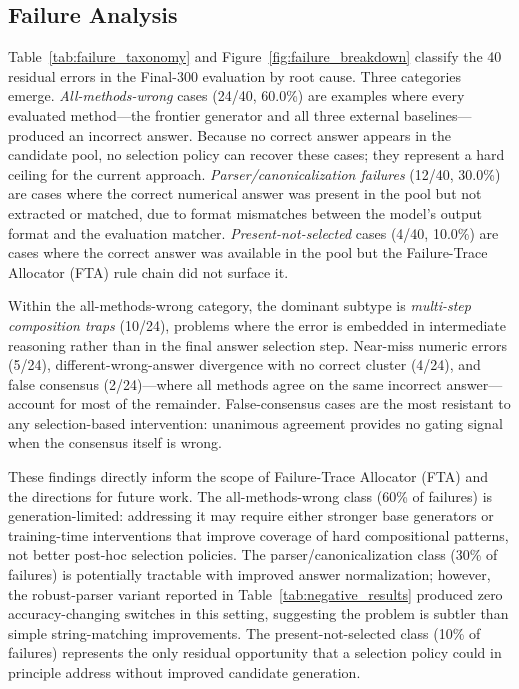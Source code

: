 \subsection{Failure Analysis}
\label{sec:failure_analysis}

Table~\ref{tab:failure_taxonomy} and Figure~\ref{fig:failure_breakdown}
classify the 40 residual errors in the Final-300 evaluation by root cause.
Three categories emerge.
\emph{All-methods-wrong} cases (24/40, 60.0\%) are examples where every evaluated
method---the frontier generator and all three external baselines---produced an
incorrect answer.
Because no correct answer appears in the candidate pool, no selection policy can
recover these cases; they represent a hard ceiling for the current approach.
\emph{Parser/canonicalization failures} (12/40, 30.0\%) are cases where the
correct numerical answer was present in the pool but not extracted or matched, due
to format mismatches between the model's output format and the evaluation matcher.
\emph{Present-not-selected} cases (4/40, 10.0\%) are cases where the correct
answer was available in the pool but the Failure-Trace Allocator (FTA) rule chain did not surface it.

Within the all-methods-wrong category, the dominant subtype is
\emph{multi-step composition traps} (10/24), problems where the error is embedded
in intermediate reasoning rather than in the final answer selection step.
Near-miss numeric errors (5/24), different-wrong-answer divergence with no correct
cluster (4/24), and false consensus (2/24)---where all methods agree on the same
incorrect answer---account for most of the remainder.
False-consensus cases are the most resistant to any selection-based intervention:
unanimous agreement provides no gating signal when the consensus itself is wrong.

These findings directly inform the scope of Failure-Trace Allocator (FTA) and the directions for
future work.
The all-methods-wrong class (60\% of failures) is generation-limited: addressing it
may require either stronger base generators or training-time interventions that improve
coverage of hard compositional patterns, not better post-hoc selection policies.
The parser/canonicalization class (30\% of failures) is potentially tractable with
improved answer normalization; however, the robust-parser variant reported in
Table~\ref{tab:negative_results} produced zero
accuracy-changing switches in this setting, suggesting the problem is subtler than
simple string-matching improvements.
The present-not-selected class (10\% of failures) represents the only residual
opportunity that a selection policy could in principle address without improved
candidate generation.
